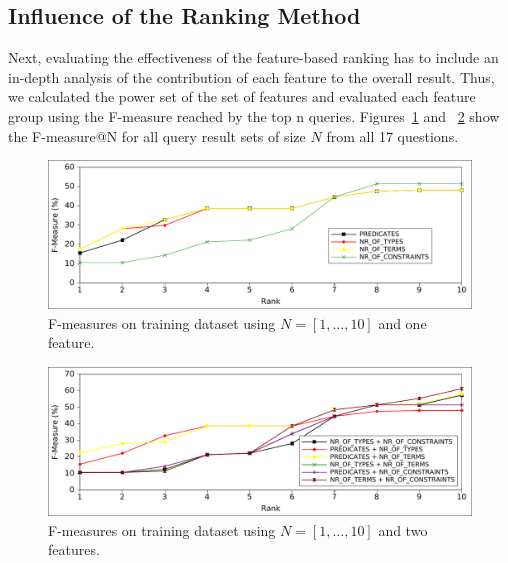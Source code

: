 \subsection{Influence of the Ranking Method}
Next, evaluating the effectiveness of the feature-based ranking has to include an in-depth analysis of the contribution of each feature to the overall result.
Thus, we calculated the power set of the set of features and evaluated each feature group using the F-measure reached by the top n queries. 
Figures~\ref{chahawk:fig:ranking_1} and ~\ref{chahawk:fig:ranking_2} show the F-measure@N for all query result sets of size $N$ from all 17 questions. 
\begin{figure}[htb!]
\includegraphics[width=\linewidth]{chapter_four/ESWC_HAWK/onefeature}
\caption{F-measures on training dataset using $N=[1,\ldots,10]$ and one feature.}
\label{chahawk:fig:ranking_1}
\end{figure}
\begin{figure}[htb!]
\includegraphics[width=\linewidth]{chapter_four/ESWC_HAWK/twofeature}
\caption{F-measures on training dataset using $N=[1,\ldots,10]$ and two features.}
\label{chahawk:fig:ranking_2}
\end{figure}

